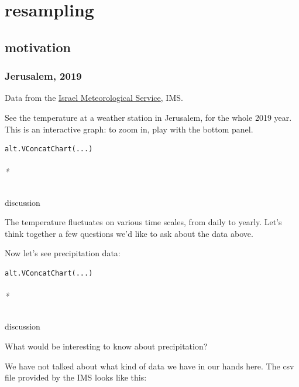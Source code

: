 \documentclass[
  letterpaper,
  DIV=11,
  numbers=noendperiod,
  oneside]{scrreprt}
\let\oldparagraph\paragraph
\renewcommand{\paragraph}[1]{\oldparagraph{#1}\mbox{}}
\begin{document}
\part{resampling}

\hypertarget{motivation}{%
\chapter{motivation}\label{motivation}}

\hypertarget{jerusalem-2019}{%
\section{Jerusalem, 2019}\label{jerusalem-2019}}

Data from the \href{https://ims.gov.il/en/data_gov}{Israel
Meteorological Service}, IMS.

See the temperature at a weather station in Jerusalem, for the whole
2019 year. This is an interactive graph: to zoom in, play with the
bottom panel.

\begin{verbatim}
alt.VConcatChart(...)
\end{verbatim}

\hypertarget{iconify-cil-chat-bubble-discussion}{%
\paragraph*{\texorpdfstring{
discussion}{ discussion}}\label{iconify-cil-chat-bubble-discussion}}

The temperature fluctuates on various time scales, from daily to yearly.
Let's think together a few questions we'd like to ask about the data
above.

Now let's see precipitation data:

\begin{verbatim}
alt.VConcatChart(...)
\end{verbatim}

\hypertarget{iconify-cil-chat-bubble-discussion-1}{%
\paragraph*{\texorpdfstring{
discussion}{ discussion}}\label{iconify-cil-chat-bubble-discussion-1}}

What would be interesting to know about precipitation?

We have not talked about what kind of data we have in our hands here.
The csv file provided by the IMS looks like this:
\end{document}
